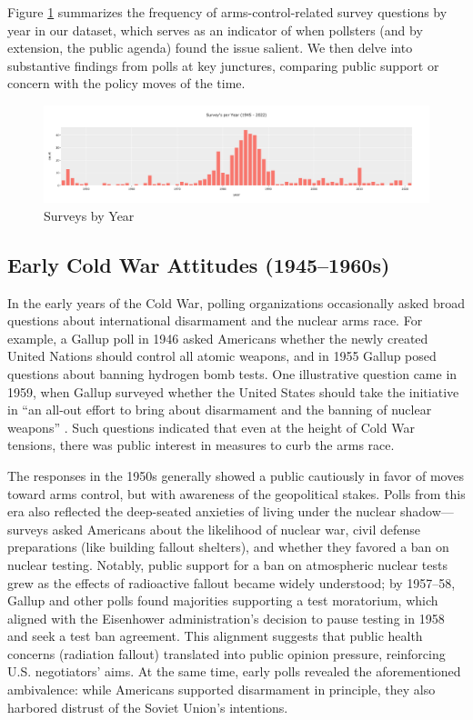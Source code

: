 \documentclass[11,5 pt]{article}
\begin{document}
    Figure \ref{fig:Survey Data} summarizes the frequency of arms-control-related survey questions by year in our dataset, which serves as an indicator of when pollsters (and by extension, the public agenda) found the issue salient. We then delve into substantive findings from polls at key junctures, comparing public support or concern with the policy moves of the time.
    
    \begin{figure}[!htb]
        \centering
        \includegraphics[scale=0.265]{images/Survey_Data.png}
        \caption{Surveys by Year}
        \label{fig:Survey Data}
    \end{figure}
    

\subsection*{Early Cold War Attitudes (1945–1960s)}

    In the early years of the Cold War, polling organizations occasionally asked broad questions about international disarmament and the nuclear arms race. For example, a Gallup poll in 1946 asked Americans whether the newly created United Nations should control all atomic weapons, and in 1955 Gallup posed questions about banning hydrogen bomb tests. One illustrative question came in 1959, when Gallup surveyed whether the United States should take the initiative in “an all-out effort to bring about disarmament and the banning of nuclear weapons” \cite{CornellRoper}. Such questions indicated that even at the height of Cold War tensions, there was public interest in measures to curb the arms race. 
    
    The responses in the 1950s generally showed a public cautiously in favor of moves toward arms control, but with awareness of the geopolitical stakes. Polls from this era also reflected the deep-seated anxieties of living under the nuclear shadow—surveys asked Americans about the likelihood of nuclear war, civil defense preparations (like building fallout shelters), and whether they favored a ban on nuclear testing. Notably, public support for a ban on atmospheric nuclear tests grew as the effects of radioactive fallout became widely understood; by 1957–58, Gallup and other polls found majorities supporting a test moratorium, which aligned with the Eisenhower administration’s decision to pause testing in 1958 and seek a test ban agreement. This alignment suggests that public health concerns (radiation fallout) translated into public opinion pressure, reinforcing U.S. negotiators’ aims. At the same time, early polls revealed the aforementioned ambivalence: while Americans supported disarmament in principle, they also harbored distrust of the Soviet Union’s intentions.
    
\end{document}
